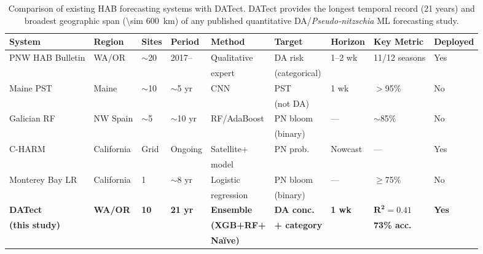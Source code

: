\documentclass[preprint,12pt,authoryear]{elsarticle}
\begin{document}
\begin{table}[!htbp]
\centering
\caption{Comparison of existing HAB forecasting systems with DATect. DATect provides the longest temporal record (21 years) and broadest geographic span (\SI{\sim 600}{\kilo\meter}) of any published quantitative DA/\textit{Pseudo-nitzschia} ML forecasting study.}
\label{tab:system-comparison}
\small
\begin{tabular}{@{}lllllllll@{}}
\toprule
\textbf{System} & \textbf{Region} & \textbf{Sites} & \textbf{Period} & \textbf{Method} & \textbf{Target} & \textbf{Horizon} & \textbf{Key Metric} & \textbf{Deployed} \\
\midrule
PNW HAB Bulletin & WA/OR & $\sim$20 & 2017-- & Qualitative & DA risk & 1--2 wk & 11/12 seasons & Yes \\
\citep{McCabe2023} & & & & expert & (categorical) & & & \\
\addlinespace
Maine PST & Maine & $\sim$10 & $\sim$5 yr & CNN & PST & 1 wk & $>$95\% & No \\
\citep{Grasso2019} & & & & & (not DA) & & & \\
\addlinespace
Galician RF & NW Spain & $\sim$5 & $\sim$10 yr & RF/AdaBoost & PN bloom & --- & $\sim$85\% & No \\
\citep{Alaez2021} & & & & & (binary) & & & \\
\addlinespace
C-HARM & California & Grid & Ongoing & Satellite+ & PN prob. & Nowcast & --- & Yes \\
\citep{Anderson2016} & & & & model & & & & \\
\addlinespace
Monterey Bay LR & California & 1 & $\sim$8 yr & Logistic & PN bloom & --- & $\geq$75\% & No \\
\citep{Lane2009} & & & & regression & (binary) & & & \\
\addlinespace
\textbf{DATect} & \textbf{WA/OR} & \textbf{10} & \textbf{21 yr} & \textbf{Ensemble} & \textbf{DA conc.} & \textbf{1 wk} & $\boldsymbol{R^2 = 0.41}$ & \textbf{Yes} \\
\textbf{(this study)} & & & & \textbf{(XGB+RF+} & \textbf{+ category} & & \textbf{73\% acc.} & \\
& & & & \textbf{Na\"ive)} & & & & \\
\bottomrule
\end{tabular}
\end{table}


\end{document}
